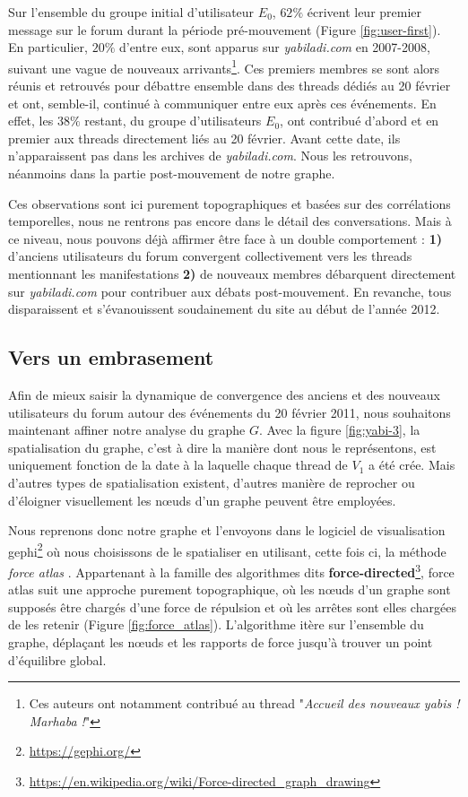 \documentclass[symmetric,justified,marginals=raggedouter]{tufte-book}
\begin{document}
\noindent Sur l'ensemble du groupe initial d'utilisateur $E_0$, $62\%$ écrivent leur premier message sur le forum durant la période pré-mouvement (Figure \ref{fig:user-first}). En particulier, $20\%$ d'entre eux, sont apparus sur \textit{yabiladi.com} en 2007-2008, suivant une vague de nouveaux arrivants\footnote{Ces auteurs ont notamment contribué au thread "\textit{Accueil des nouveaux yabis ! Marhaba !}"}. Ces premiers membres se sont alors réunis et retrouvés pour débattre ensemble dans des threads dédiés au 20 février et ont, semble-il, continué à communiquer entre eux après ces événements. En effet, les $38\%$ restant, du groupe d'utilisateurs $E_0$, ont contribué d'abord et en premier aux threads directement liés au 20 février. Avant cette date, ils n'apparaissent pas dans les archives de \textit{yabiladi.com}. Nous les retrouvons, néanmoins dans la partie post-mouvement de notre graphe. 


Ces observations sont ici purement topographiques et basées sur des corrélations temporelles, nous ne rentrons pas encore dans le détail des conversations. Mais à ce niveau, nous pouvons déjà affirmer être face à un double comportement : \textbf{1)} d'anciens utilisateurs du forum convergent collectivement vers les threads mentionnant les manifestations \textbf{2)} de nouveaux membres débarquent directement sur \textit{yabiladi.com} pour contribuer aux débats post-mouvement. En revanche, tous disparaissent et s'évanouissent soudainement du site au début de l'année 2012.

\subsection{Vers un embrasement}

\noindent Afin de mieux saisir la dynamique de convergence des anciens et des nouveaux utilisateurs du forum autour des événements du 20 février 2011, nous souhaitons maintenant affiner notre analyse du graphe $G$. Avec la figure \ref{fig:yabi-3}, la spatialisation du graphe, c'est à dire la manière dont nous le représentons, est uniquement fonction de la date à la laquelle chaque thread de $V_1$ a été crée. Mais d'autres types de spatialisation existent, d'autres manière de reprocher ou d'éloigner visuellement les nœuds d'un graphe peuvent être employées. 

Nous reprenons donc notre graphe et l'envoyons dans le logiciel de visualisation gephi\footnote{\url{https://gephi.org/}} où nous choisissons de le spatialiser en utilisant, cette fois ci, la méthode \textit{force atlas} \citep{jacomy_forceatlas2_2014}. Appartenant à la famille des algorithmes dits \textbf{force-directed}\footnote{\url{https://en.wikipedia.org/wiki/Force-directed_graph_drawing}}, force atlas suit une approche purement topographique, où les nœuds  
d'un graphe sont supposés être chargés d'une force de répulsion et où les arrêtes sont elles chargées de les retenir (Figure \ref{fig:force_atlas}). L'algorithme itère sur l'ensemble du graphe, déplaçant les nœuds et les rapports de force jusqu'à trouver un point d'équilibre global.
\end{document}
